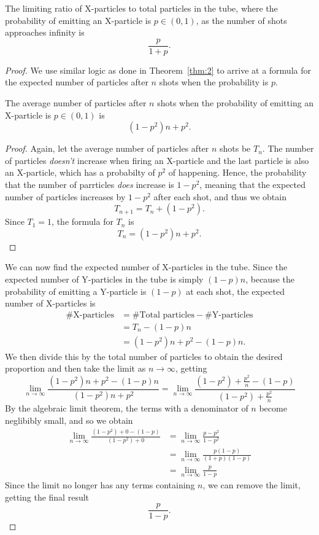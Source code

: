 \begin{theorem}
  The limiting ratio of X-particles to total particles in the tube, where the probability of emitting an X-particle is $p \in (0, 1)$, as the number of shots approaches infinity is \[
  \frac{p}{1+p}
  .\]
\end{theorem}
\begin{proof}
  We use similar logic as done in Theorem~\ref{thm:2} to arrive at a formula for the expected number of particles after $n$ shots when the probability is $p$.
  \begin{claim}
    The average number of particles after $n$ shots when the probability of emitting an X-particle is $p \in (0, 1)$ is \[
      (1-p^2)n + p^2
    .\] 
  \end{claim}
  \begin{proof}
    Again, let the average number of particles after $n$ shots be $T_n$. The number of particles \emph{doesn't} increase when firing an X-particle and the last particle is also an X-particle, which has a probabilty of $p^2$ of happening. Hence, the probability that the number of parrticles \emph{does} increase is $1-p^2$, meaning that the expected number of particles increases by $1-p^2$ after each shot, and thus we obtain \[
      T_{n+1} = T_{n} + (1-p^2)
    .\] Since $T_1 = 1$, the formula for $T_{n}$ is \[
      T_{n} = (1-p^2)n + p^2 \tag*{\qedhere}
    .\] 
  \end{proof}
  We can now find the expected number of X-particles in the tube. Since the expected number of Y-particles in the tube is simply $(1 - p)n$, because the probability of emitting a Y-particle is $(1-p)$ at each shot, the expected number of X-particles is 
  \begin{align*}
    \#\text{X-particles} &= \#\text{Total particles} - \#\text{Y-particles} \\
                         &= T_n - (1-p)n \\
                         &= (1-p^2)n + p^2 - (1-p)n.
  \end{align*}
  We then divide this by the total number of particles to obtain the desired proportion and then take the limit as $n \to \infty$, getting 
  \begin{equation*}
    \lim_{n \to \infty} \frac{(1-p^2)n + p^2 - (1-p)n}{(1-p^2)n + p^2} = \lim_{n \to \infty} \frac{(1-p^2) + \frac{p^2}{n} - (1-p)}{(1-p^2) + \frac{p^2}{n}}
  \end{equation*}
  By the algebraic limit theorem, the terms with a denominator of $n$ become neglibibly small, and so we obtain 
  \begin{align*}
    \lim_{n \to \infty} \frac{(1-p^2) + 0 - (1-p)}{(1-p^2) + 0} &= \lim_{n \to \infty} \frac{p - p^2}{1 - p^2} \\
                                                                &= \lim_{n \to \infty} \frac{p(1 - p)}{(1+p)(1-p)} \\
                                                                &= \lim_{n \to \infty} \frac{p}{1-p}
  \end{align*}
  Since the limit no longer has any terms containing $n$, we can remove the limit, getting the final result \[
    \frac{p}{1-p} \tag*{\qedhere}
  .\] 
\end{proof}
